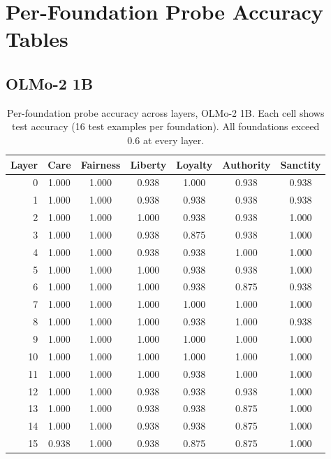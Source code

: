 \section{Per-Foundation Probe Accuracy Tables}\label{per-foundation-probe-accuracy-tables}

\label{app:accuracy}

\subsection{OLMo-2 1B}\label{a.1-olmo-2-1b}

\begin{table}[h]
\centering
\caption{Per-foundation probe accuracy across layers, OLMo-2 1B. Each cell shows test accuracy (16 test examples per foundation). All foundations exceed 0.6 at every layer.}
\label{tab:accuracy_olmo}
\small
\begin{tabular}{r cccccc}
\toprule
Layer & Care & Fairness & Liberty & Loyalty & Authority & Sanctity \\
\midrule
0  & 1.000 & 1.000 & 0.938 & 1.000 & 0.938 & 0.938 \\
1  & 1.000 & 1.000 & 0.938 & 0.938 & 0.938 & 0.938 \\
2  & 1.000 & 1.000 & 1.000 & 0.938 & 0.938 & 1.000 \\
3  & 1.000 & 1.000 & 0.938 & 0.875 & 0.938 & 1.000 \\
4  & 1.000 & 1.000 & 0.938 & 0.938 & 1.000 & 1.000 \\
5  & 1.000 & 1.000 & 1.000 & 0.938 & 0.938 & 1.000 \\
6  & 1.000 & 1.000 & 1.000 & 0.938 & 0.875 & 0.938 \\
7  & 1.000 & 1.000 & 1.000 & 1.000 & 1.000 & 1.000 \\
8  & 1.000 & 1.000 & 1.000 & 0.938 & 1.000 & 0.938 \\
9  & 1.000 & 1.000 & 1.000 & 1.000 & 1.000 & 1.000 \\
10 & 1.000 & 1.000 & 1.000 & 1.000 & 1.000 & 1.000 \\
11 & 1.000 & 1.000 & 1.000 & 0.938 & 1.000 & 1.000 \\
12 & 1.000 & 1.000 & 0.938 & 0.938 & 0.938 & 1.000 \\
13 & 1.000 & 1.000 & 0.938 & 0.938 & 0.875 & 1.000 \\
14 & 1.000 & 1.000 & 0.938 & 0.938 & 0.875 & 1.000 \\
15 & 0.938 & 1.000 & 0.938 & 0.875 & 0.875 & 1.000 \\
\bottomrule
\end{tabular}
\end{table}

